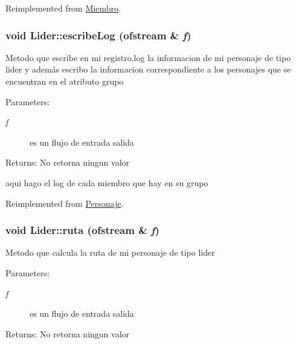 Reimplemented from \hyperlink{classMiembro_28498c7229e81e64d0cb7ea69515dca0}{Miembro}.\hypertarget{classLider_fcd179370f87dbc08bf6619ff9742f66}{
\subsubsection[escribeLog]{\setlength{\rightskip}{0pt plus 5cm}void Lider::escribeLog (ofstream \& {\em f})}}
\label{classLider_fcd179370f87dbc08bf6619ff9742f66}


Metodo que escribe en mi registro.log la informacion de mi personaje de tipo lider y además escribo la informacion correspondiente a los personajes que se encuentran en el atributo grupo \begin{Desc}
\item[Parameters:]
\begin{description}
\item[{\em f}]es un flujo de entrada salida \end{description}
\end{Desc}
\begin{Desc}
\item[Returns:]No retorna ningun valor \end{Desc}


aqui hago el log de cada miembro que hay en su grupo 

Reimplemented from \hyperlink{classPersonaje_86fe4a1ff708072d98c6be42bbd512ea}{Personaje}.\hypertarget{classLider_6b98929df0d59cd29b85e6fb8aeb36f1}{
\subsubsection[ruta]{\setlength{\rightskip}{0pt plus 5cm}void Lider::ruta (ofstream \& {\em f})}}
\label{classLider_6b98929df0d59cd29b85e6fb8aeb36f1}


Metodo que calcula la ruta de mi personaje de tipo lider \begin{Desc}
\item[Parameters:]
\begin{description}
\item[{\em f}]es un flujo de entrada salida \end{description}
\end{Desc}
\begin{Desc}
\item[Returns:]No retorna ningun valor \end{Desc}


